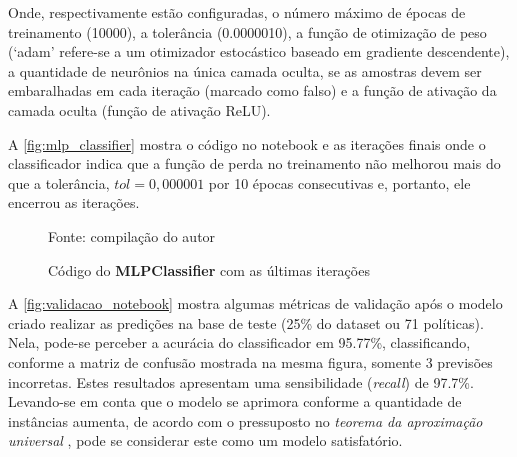
Onde, respectivamente estão configuradas, o número máximo de épocas de treinamento (10000), a tolerância (0.0000010), a função de otimização de peso (`adam' refere-se a um otimizador estocástico baseado em gradiente descendente), a quantidade de neurônios na única camada oculta, se as amostras devem ser embaralhadas em cada iteração (marcado como falso) e a função de ativação da camada oculta (função de ativação ReLU).

A \autoref{fig:mlp_classifier} mostra o código no notebook e as iterações finais onde o classificador indica que a função de perda no treinamento não melhorou mais do que a tolerância, $tol = 0,000001$ por 10 épocas consecutivas e, portanto, ele encerrou as iterações.

\begin{figure}[h!]
	\centering
	\caption{Código do \textbf{MLPClassifier} com as últimas iterações}
	
	\label{fig:mlp_classifier}
	{\scriptsize Fonte: compilação do autor}
\end{figure}

A \autoref{fig:validacao_notebook} mostra algumas métricas de validação após o modelo criado realizar as predições na base de teste (25\% do dataset ou 71 políticas). Nela, pode-se perceber a acurácia do classificador em 95.77\%, classificando, conforme a matriz de confusão mostrada na mesma figura, somente 3 previsões incorretas. Estes resultados apresentam uma sensibilidade (\textit{recall}) de 97.7\%. Levando-se em conta que o modelo se aprimora conforme a quantidade de instâncias aumenta, de acordo com o pressuposto no\textit{ teorema da aproximação universal} , pode se considerar este como um modelo satisfatório.

